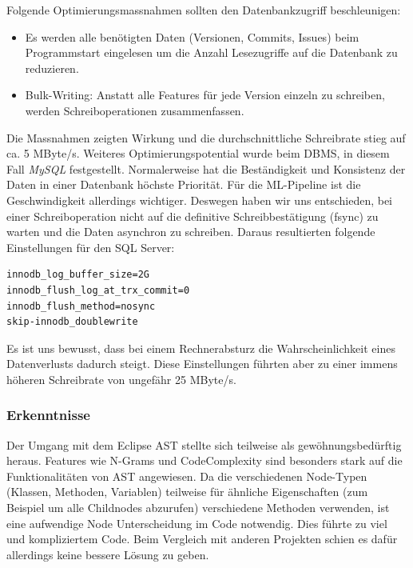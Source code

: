 \documentclass[10pt, a4paper]{article}
\begin{document}
Folgende Optimierungsmassnahmen sollten den Datenbankzugriff beschleunigen:
\begin{itemize}
	\item Es werden alle benötigten Daten (Versionen, Commits, Issues) beim Programmstart eingelesen um die Anzahl Lesezugriffe auf die Datenbank zu reduzieren.
	\item Bulk-Writing: Anstatt alle Features für jede Version einzeln zu schreiben, werden Schreiboperationen zusammenfassen.
\end{itemize}
Die Massnahmen zeigten Wirkung und die durchschnittliche Schreibrate stieg auf ca. 5 MByte/s. Weiteres Optimierungspotential wurde beim \ac{DBMS}, in diesem Fall \emph{MySQL} festgestellt. Normalerweise hat die Beständigkeit und Konsistenz der Daten in einer Datenbank höchste Priorität. Für die ML-Pipeline ist die Geschwindigkeit allerdings wichtiger. Deswegen haben wir uns entschieden, bei einer Schreiboperation nicht auf die definitive Schreibbestätigung (fsync) zu warten und die Daten asynchron zu schreiben. Daraus resultierten folgende Einstellungen für den SQL Server:

\begin{minipage}{\linewidth}
\begin{lstlisting}[frame=single,caption={MySQL Konfiguration}]
innodb_log_buffer_size=2G
innodb_flush_log_at_trx_commit=0
innodb_flush_method=nosync
skip-innodb_doublewrite
\end{lstlisting}
\end{minipage}

Es ist uns bewusst, dass bei einem Rechnerabsturz die Wahrscheinlichkeit eines Datenverlusts dadurch steigt. Diese Einstellungen führten aber zu einer immens höheren Schreibrate von ungefähr 25 MByte/s.

\subsubsection{Erkenntnisse}

Der Umgang mit dem Eclipse AST stellte sich teilweise als gewöhnungsbedürftig heraus. Features wie N-Grams und CodeComplexity sind besonders stark auf die Funktionalitäten von AST angewiesen. Da die verschiedenen Node-Typen (Klassen, Methoden, Variablen) teilweise für ähnliche Eigenschaften (zum Beispiel um alle Childnodes abzurufen) verschiedene Methoden verwenden, ist eine aufwendige Node Unterscheidung im Code notwendig. Dies führte zu viel und kompliziertem Code. Beim Vergleich mit anderen Projekten schien es dafür allerdings keine bessere Lösung zu geben. 
\end{document}
